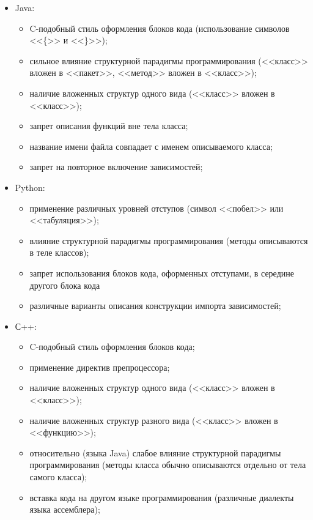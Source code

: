 \begin{itemize}[noitemsep]
  \item Java:
    \begin{itemize}[noitemsep]
      \item C-подобный стиль оформления блоков кода (использование символов <<\{>> и <<\}>>);
      \item сильное влияние структурной парадигмы программирования (<<класс>> вложен в <<пакет>>, <<метод>> вложен в <<класс>>);
      \item наличие вложенных структур одного вида (<<класс>> вложен в <<класс>>);
      \item запрет описания функций вне тела класса;
      \item название имени файла совпадает с именем описываемого класса;
      \item запрет на повторное включение зависимостей;
    \end{itemize}

  \item Python:
    \begin{itemize}[noitemsep]
      \item применение различных уровней отступов (символ <<побел>> или <<табуляция>>);
      \item влияние структурной парадигмы программирования (методы описываются в теле классов);
      \item запрет использования блоков кода, оформенных отступами, в середине другого блока кода
      \item различные варианты описания конструкции импорта зависимостей;
    \end{itemize}

  \item С++:
    \begin{itemize}[noitemsep]
      \item C-подобный стиль оформления блоков кода;
      \item применение директив препроцессора;
      \item наличие вложенных структур одного вида (<<класс>> вложен в <<класс>>);
      \item наличие вложенных структур разного вида (<<класс>> вложен в <<функцию>>);
      \item относительно (языка Java) слабое влияние структурной парадигмы программирования (методы класса обычно описываются отдельно от тела самого класса);
      \item вставка кода на другом языке программирования (различные диалекты языка ассемблера);
    \end{itemize}


\end{itemize}
